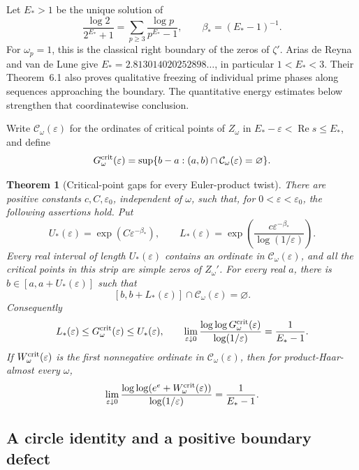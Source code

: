\documentclass[11pt,letterpaper]{article}
\newtheorem{theorem}{Theorem}[section]
\theoremstyle{definition}
\theoremstyle{remark}
\newcommand{\eps}{\varepsilon}
\renewcommand{\Re}{\operatorname{Re}}
\newcommand{\1}{\mathbf 1}
\begin{document}
Let $E_*>1$ be the unique solution of
\begin{equation}\label{p02:eul:critical-edge}
 \frac{\log2}{2^{E_*}+1}
 =\sum_{p\ge3}\frac{\log p}{p^{E_*}-1},
 \qquad \beta_*=(E_*-1)^{-1}.
\end{equation}
For $\omega_p=1$, this is the classical right boundary of the zeros
of $\zeta'$. Arias de Reyna and van de Lune
\cite[Theorem~5.1]{AriasLune} give
$E_*=2.813014020252898\ldots$, in particular $1<E_*<3$.
Their Theorem~6.1 also proves qualitative freezing of individual prime
phases along sequences approaching the boundary. The quantitative
energy estimates below strengthen that coordinatewise conclusion.

Write $\mathcal C_\omega(\eps)$ for the ordinates of critical points
of $Z_\omega$ in $E_*-\eps<\Re s\le E_*$, and define
\[
 G^{\rm crit}_\omega(\eps)=
 \sup\{b-a:(a,b)\cap\mathcal C_\omega(\eps)=\varnothing\}.
\]

\begin{theorem}[Critical-point gaps for every Euler-product twist]
\label{p02:eul:gap}
There are positive constants $c,C,\eps_0$, independent of $\omega$,
such that, for $0<\eps<\eps_0$, the following assertions hold. Put
\[
 U_*(\eps)=\exp(C\eps^{-\beta_*}),\qquad
 L_*(\eps)=\exp\!\left(
        \frac{c\eps^{-\beta_*}}{\log(1/\eps)}\right).
\]
Every real interval of length $U_*(\eps)$ contains an ordinate in
$\mathcal C_\omega(\eps)$, and all the critical points in this strip
are simple zeros of $Z_\omega'$. For every real $a$, there is
$b\in[a,a+U_*(\eps)]$ such that
\[
 [b,b+L_*(\eps)]\cap\mathcal C_\omega(\eps)=\varnothing.
\]
Consequently
\begin{equation}\label{p02:eul:gap-exponent}
 L_*(\eps)\le G^{\rm crit}_\omega(\eps)\le U_*(\eps),
 \qquad
 \lim_{\eps\downarrow0}
 \frac{\log\log G^{\rm crit}_\omega(\eps)}{\log(1/\eps)}
 =\frac1{E_*-1}.
\end{equation}
If $W^{\rm crit}_\omega(\eps)$ is the first nonnegative ordinate in
$\mathcal C_\omega(\eps)$, then for product-Haar-almost every $\omega$,
\begin{equation}\label{p02:eul:waiting}
 \lim_{\eps\downarrow0}
 \frac{\log\log(e^e+W^{\rm crit}_\omega(\eps))}{\log(1/\eps)}
 =\frac1{E_*-1}.
\end{equation}
\end{theorem}

\subsection{A circle identity and a positive boundary defect}
\end{document}
